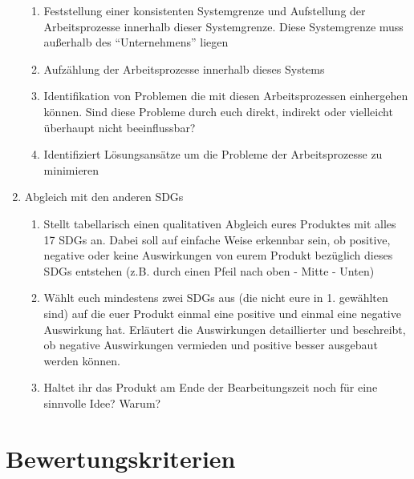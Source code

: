 \documentclass[DIV=15,headinclude=true]{scrreprt}
\begin{document}
\begin{enumerate}
	      \begin{enumerate}
		      \item
		            Feststellung einer konsistenten Systemgrenze und Aufstellung der
		            Arbeitsprozesse innerhalb dieser Systemgrenze. Diese Systemgrenze
		            muss außerhalb des ``Unternehmens'' liegen
		      \item
		            Aufzählung der Arbeitsprozesse innerhalb dieses Systems
		      \item
		            Identifikation von Problemen die mit diesen Arbeitsprozessen
		            einhergehen können. Sind diese Probleme durch euch direkt, indirekt
		            oder vielleicht überhaupt nicht beeinflussbar?
		      \item
		            Identifiziert Lösungsansätze um die Probleme der Arbeitsprozesse zu
		            minimieren
	      \end{enumerate}
	\item
	      Abgleich mit den anderen SDGs

	      \begin{enumerate}
		      \item
		            Stellt tabellarisch einen qualitativen Abgleich eures Produktes mit
		            alles 17 SDGs an. Dabei soll auf einfache Weise erkennbar sein, ob
		            positive, negative oder keine Auswirkungen von eurem Produkt
		            bezüglich dieses SDGs entstehen (z.B. durch einen Pfeil nach oben -
		            Mitte - Unten)
		      \item
		            Wählt euch mindestens zwei SDGs aus (die nicht eure in 1. gewählten
		            sind) auf die euer Produkt einmal eine positive und einmal eine
		            negative Auswirkung hat. Erläutert die Auswirkungen detaillierter
		            und beschreibt, ob negative Auswirkungen vermieden und positive
		            besser ausgebaut werden können.
		      \item
		            Haltet ihr das Produkt am Ende der Bearbeitungszeit noch für eine
		            sinnvolle Idee? Warum?
	      \end{enumerate}
\end{enumerate}

\section{Bewertungskriterien}
\end{document}
